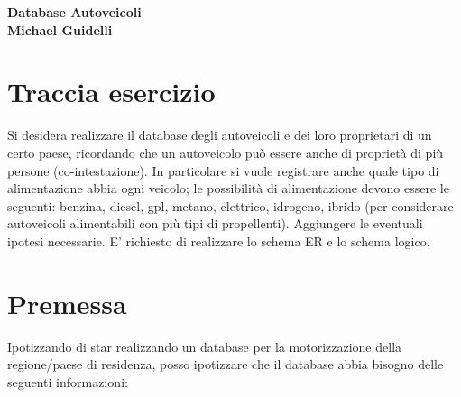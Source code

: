 \documentclass[12pt]{article}
\date{}
\begin{document}

\maketitle
\null \null \null \null \null \null
{\centering
    \huge\bfseries Database Autoveicoli \\
    \Large\normalfont Michael Guidelli  \\
}

\clearpage


\section*{Traccia esercizio}

\noindent
Si desidera realizzare il database degli autoveicoli e dei loro proprietari di un certo paese, ricordando che
un autoveicolo può essere anche di proprietà di più persone (co-intestazione). In particolare si vuole
registrare anche quale tipo di alimentazione abbia ogni veicolo; le possibilità di alimentazione devono
essere le seguenti: benzina, diesel, gpl, metano, elettrico, idrogeno, ibrido (per considerare autoveicoli
alimentabili con più tipi di propellenti). Aggiungere le eventuali ipotesi necessarie. E' richiesto di
realizzare lo schema ER e lo schema logico.

\clearpage


\renewcommand{\contentsname}{Indice \label{indice}}
\tableofcontents

\renewcommand{\listfigurename}{Lista delle figure}
\listoffigures

\renewcommand{\listtablename}{Liste Attributi}
\listoftables

\clearpage


\section{Premessa}

\noindent
Ipotizzando di star realizzando un database per la motorizzazione della regione/paese di residenza, posso ipotizzare che il database abbia bisogno delle seguenti informazioni: \newline
\end{document}
